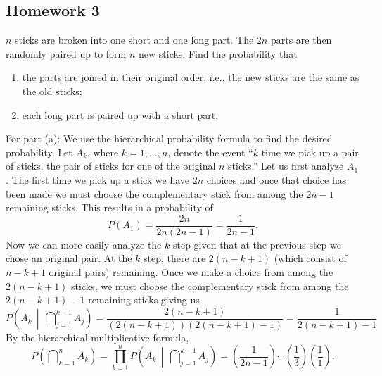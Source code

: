 \subsection{Homework 3}
\begin{problem}[Handout 3, \# 3]
  \(n\) sticks are broken into one short and one long part. The \(2n\)
  parts are then randomly paired up to form \(n\) new sticks. Find the
  probability that
  \begin{enumerate}[label=(\alph*),noitemsep]
  \item the parts are joined in their original order, i.e., the new sticks
    are the same as the old sticks;
  \item each long part is paired up with a short part.
  \end{enumerate}
\end{problem}
\begin{solution*}
  For part (a): We use the hierarchical probability formula to find the
  desired probability. Let \(A_k\), where \(k=1,\dotsc,n\), denote the
  event ``\(k\) time we pick up a pair of sticks, the pair of
  sticks for one of the original \(n\) sticks.'' Let us first analyze
  \(A_1\). The first time we pick up a stick we have \(2n\) choices and
  once that choice has been made we must choose the complementary stick
  from among the \(2n-1\) remaining sticks. This results in a probability
  of
  \[
    P(A_1)=\frac{2n}{2n(2n-1)}=\frac{1}{2n-1}.
  \]
  Now we can more easily analyze the \(k\) step given that at
  the previous step we chose an original pair. At the \(k\)
  step, there are \(2(n-k+1)\) (which consist of \(n-k+1\) original pairs)
  remaining. Once we make a choice from among the \(2(n-k+1)\) sticks, we
  must choose the complementary stick from among the \(2(n-k+1)-1\)
  remaining sticks giving us
  \[
    P\left(A_k\,\middle|\,\bigcap\nolimits_{j=1}^{k-1}A_j\right)=%
    \frac{2(n-k+1)}{(2(n-k+1))(2(n-k+1)-1)}=%
    \frac{1}{2(n-k+1)-1}
  \]
  By the hierarchical multiplicative formula,
  \[
    P\left(\bigcap\nolimits_{k=1}^n A_k\right)=%
    \prod_{k=1}^n P\left(A_k\,\middle|\,\bigcap\nolimits_{j=1}^{k-1}A_j\right)=%
    \left(\frac{1}{2n-1}\right)%
    \dotsm%
    \left(\frac{1}{3}\right)\left(\frac{1}{1}\right).
  \]


\end{solution*}
